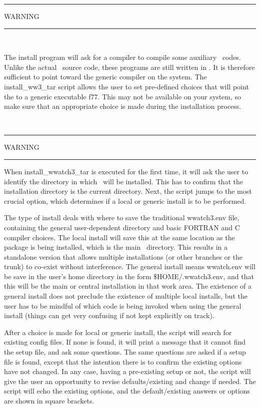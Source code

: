 \begin{center}
\rule[1mm]{55mm}{1.0mm} WARNING \rule[1mm]{55mm}{1.0mm} \\ 
\vspace{\baselineskip}

\parbox{120mm}{The install program will ask for a compiler to compile some
auxiliary \fortran\ codes. Unlike the actual \ws\ source code, these programs
are still written in . It is therefore sufficient to point toward
the generic  compiler on the system. The {\file install\_ww3\_tar}
script allows the user to set pre-defined choices that will point the
 to a generic executable {\file f77}. This may not be available on
your system, so make sure that an appropriate choice is made during the
installation process.}
\\ \vspace{\baselineskip} \rule[1mm]{55mm}{1.0mm}
WARNING \rule[1mm]{55mm}{1.0mm}
\end{center}

When {\file install\_wwatch3\_tar} is executed for the first time, it will ask
the user to identify the directory in which \ws\ will be installed. This has
to confirm that the installation directory is the current directory. Next, the
script jumps to the most crucial option, which determines if a local or generic install 
is to be performed.

The type of install deals with where to save the traditional {\file wwatch3.env} 
file, containing the general user-dependent directory and basic FORTRAN and C compiler 
choices. The local install will save this at the same location as the package
is being installed, which is the main \ws\ directory. This results in a standalone version
that allows multiple installations (or other branches or the trunk) to co-exist
without interference. The general install means wwatch.env will be save in the user's
home directory in the form {\file \$HOME/.wwatch3.env}, and that this will be the
main or central installation in that work area. The existence of a general install
does not preclude the existence of multiple local installs, but the user has to be 
mindful of which code is being invoked when using the general install (things can
get very confusing if not kept explicitly on track).

After a choice is made for local or generic install, the script will search for
existing config files. If none is found, it will print a message that it cannot find 
the setup file, and ask some questions. The same questions are asked if a setup file is found,
except that the intention there is to confirm the existing options have not changed. In any case,
having a pre-existing setup or not, the script will give the user an opportunity to revise
defaults/existing and change if needed. The script will echo the existing options, and the 
default/existing answers or options are shown in square brackets. 

